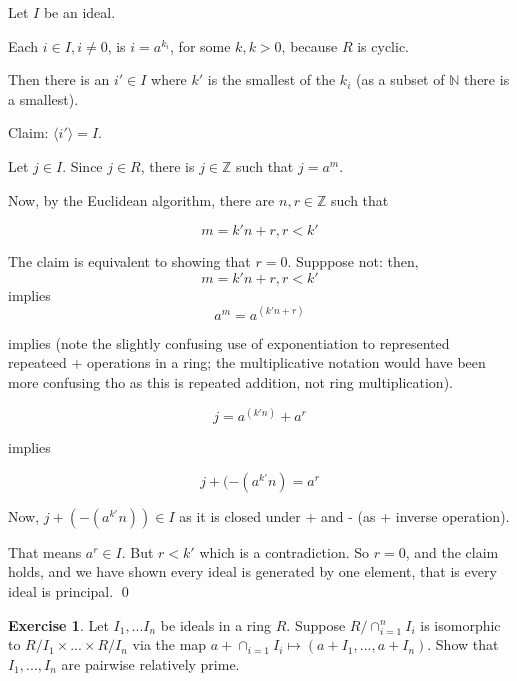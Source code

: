 \documentclass[11pt,oneside]{article}
\numberwithin{equation}{section}
\theoremstyle{definition}
\newtheorem{exercise}{Exercise}
\def\ZZ{\mathbb{Z}}
\def\NN{\mathbb{N}}
\begin{document}
\begin{solution}
  Let $I$ be an ideal.

  Each $i \in I, i \neq 0$, is $i=a^{k_i}$, for some $k, k>0$, because $R$ is cyclic.

  Then there is an $i' \in I$ where $k'$ is the smallest of the $k_i$
  (as a subset of $\NN$ there is a smallest).

  Claim:  $ \langle i' \rangle = I$.

  Let $j \in I$.  Since $j \in R$, there is $j \in \ZZ$ such that $j = a^m$.

  Now, by the Euclidean algorithm, there are $n, r \in \ZZ$ such that

  $$
  m = k' n + r, r<k'
  $$

  The claim is equivalent to showing that $r=0$.  Supppose not: then,
  $$
  m = k' n + r, r<k'
  $$
  implies
  $$
  a^m = a^(k'n + r)
  $$

  implies (note the slightly confusing use of exponentiation to
  represented repeateed $+$ operations in a ring; the multiplicative
  notation would have been more confusing tho as this is repeated
  addition, not ring multiplication).  

  $$
  j = a^(k'n) + a^r
  $$

  implies

  $$
  j + (-(a^{k'}n) = a^r
  $$

  Now, $j + (-(a^{k'}n)) \in I$ as it is closed under + and - (as + inverse operation).

  That means $a^r \in I$.  But $ r < k'$ which is a contradiction.  So
  $r=0$, and the claim holds, and we have shown every ideal is generated by one element, that is
  every ideal is principal.
  \qed
  
  
\end{solution}
\begin{exercise}
  Let $I_1, ... I_n$ be ideals in a ring $R$.  Suppose $R/\cap_{i=1}^n
  I_i$ is isomorphic to $R/I_1 \times ... \times R/I_n$ via the map
  $a+\cap_{i=1}I_i \mapsto (a + I_1, ... , a+ I_n)$.  Show that $I_1,
  ... , I_n$ are pairwise relatively prime.
\end{exercise}
\begin{solution}
\end{solution}

\begin{comment}
  \begin{exercise}
    problem
  \end{exercise}
  \begin{solution}
    \begin{enumerate}[(a)]
    \item
      first answer
    \end{enumerate}
  \end{solution}
\end{comment}
\end{document}
